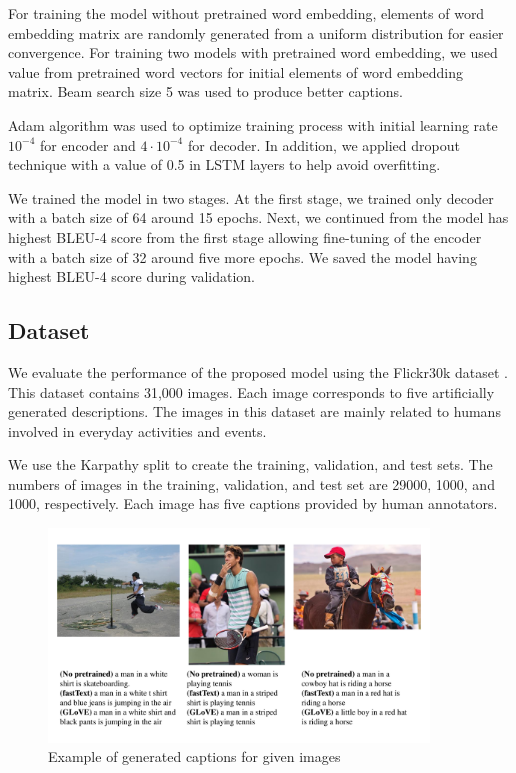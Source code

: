 \documentclass[conference]{IEEEtran}
\begin{document}
For training the model without pretrained word embedding, elements of word embedding matrix are randomly generated from a uniform distribution for easier convergence. For training two models with pretrained word embedding, we used value from pretrained word vectors for initial elements of word embedding matrix. Beam search size 5 was used to produce better captions.

Adam algorithm\cite{kingma2014adam} was used to optimize training process with initial learning rate $10^{-4}$ for encoder and $4\cdot10^{-4}$ for decoder. In addition, we applied dropout technique with a value of 0.5 in LSTM layers to help avoid overfitting. 

We trained the model in two stages. At the first stage, we trained only decoder with a batch size of 64 around 15 epochs. Next, we continued from the model has highest BLEU-4 score from the first stage allowing fine-tuning of the encoder with a batch size of 32 around five more epochs. We saved the model having highest BLEU-4 score during validation. 

\subsection{Dataset}
We evaluate the performance of the proposed model using the Flickr30k dataset \cite{jia2015guiding}. This dataset contains 31,000 images. Each image corresponds to five artificially generated descriptions. The images in this dataset are mainly related to humans involved in everyday activities and events.

We use the Karpathy split \cite{karpathy2015deep} to create the training, validation, and test sets. The numbers of images in the training, validation, and test set are 29000, 1000, and 1000, respectively. Each image has five captions provided by human annotators\cite{jia2015guiding}.


\begin{figure}[h]
\centering
\includegraphics[width=0.9\textwidth]{assets/predict.pdf}
\caption{Example of generated captions for given images}
\label{fig:predict}
\end{figure}
\end{document}
